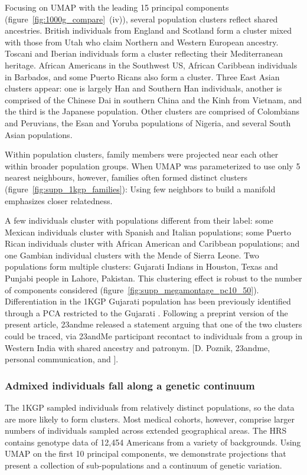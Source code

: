 \documentclass[12pt]{pnas-new}
\begin{document}
Focusing on UMAP with the leading 15 principal components (figure~\ref{fig:1000g_compare}~(iv)), several population clusters reflect shared ancestries. British individuals from England and Scotland form a cluster mixed with those from Utah who claim Northern and Western European ancestry. Toscani and Iberian individuals form a cluster reflecting their Mediterranean heritage. African Americans in the Southwest US, African Caribbean individuals in Barbados, and some Puerto Ricans also form a cluster. Three East Asian clusters appear: one is largely Han and Southern Han individuals, another is comprised of the Chinese Dai in southern China and the Kinh from Vietnam, and the third is the Japanese population. Other clusters are comprised of Colombians and Peruvians, the Esan and Yoruba populations of Nigeria, and several South Asian populations. 

Within population clusters, family members were projected near each other within broader population groups. When UMAP was parameterized to use only 5 nearest neighbours, however, families often formed distinct clusters (figure~\ref{fig:supp_1kgp_families}): Using few neighbors to build a manifold emphasizes closer relatedness.

A few individuals cluster with populations different from their label: some Mexican individuals cluster with Spanish and Italian populations; some Puerto Rican individuals cluster with African American and Caribbean populations; and one Gambian individual clusters with the Mende of Sierra Leone. Two populations form multiple clusters: Gujarati Indians in Houston, Texas and Punjabi people in Lahore, Pakistan. This clustering effect is robust to the number of components considered (figure~\ref{fig:supp_megamontage_pc10_50}). Differentiation in the 1KGP Gujarati population has been previously identified through a PCA restricted to the Gujarati \cite{reich2009india}. Following a preprint version of the present article, 23andme released a statement \cite{23andme} arguing that one of the two clusters could be traced, via 23andMe participant recontact to individuals from a group in Western India with shared ancestry and patronym. [D. Poznik, 23andme, personal communication, and \cite{23andme}].

\subsubsection*{Admixed individuals fall along a genetic continuum}
The 1KGP sampled individuals from relatively distinct populations, so the data are more likely to form clusters. Most medical cohorts, however, comprise larger numbers of individuals sampled across extended geographical areas. The HRS contains genotype data of 12,454 Americans from a variety of backgrounds. Using UMAP on the first 10 principal components, we demonstrate projections that present a collection of sub-populations and a continuum of genetic variation.
\end{document}
